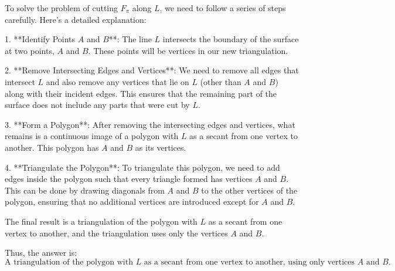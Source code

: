 To solve the problem of cutting \( F_{\pi} \) along \( L \), we need to follow a series of steps carefully. Here's a detailed explanation:

1. **Identify Points \( A \) and \( B \)**: The line \( L \) intersects the boundary of the surface at two points, \( A \) and \( B \). These points will be vertices in our new triangulation.

2. **Remove Intersecting Edges and Vertices**: We need to remove all edges that intersect \( L \) and also remove any vertices that lie on \( L \) (other than \( A \) and \( B \)) along with their incident edges. This ensures that the remaining part of the surface does not include any parts that were cut by \( L \).

3. **Form a Polygon**: After removing the intersecting edges and vertices, what remains is a continuous image of a polygon with \( L \) as a secant from one vertex to another. This polygon has \( A \) and \( B \) as its vertices.

4. **Triangulate the Polygon**: To triangulate this polygon, we need to add edges inside the polygon such that every triangle formed has vertices \( A \) and \( B \). This can be done by drawing diagonals from \( A \) and \( B \) to the other vertices of the polygon, ensuring that no additional vertices are introduced except for \( A \) and \( B \).

The final result is a triangulation of the polygon with \( L \) as a secant from one vertex to another, and the triangulation uses only the vertices \( A \) and \( B \).

Thus, the answer is:
\[
\boxed{\text{A triangulation of the polygon with } L \text{ as a secant from one vertex to another, using only vertices } A \text{ and } B.}
\]